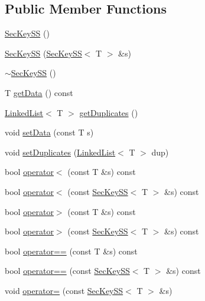 \subsection*{Public Member Functions}
\begin{DoxyCompactItemize}
\item 
\hyperlink{classSecKeySS_a9f905dffce0987d620cb2883b3f774cc}{Sec\+Key\+SS} ()
\item 
\hyperlink{classSecKeySS_ac9aecc7e01d33d17a98b732ac4f864c9}{Sec\+Key\+SS} (\hyperlink{classSecKeySS}{Sec\+Key\+SS}$<$ T $>$ \&s)
\item 
\hyperlink{classSecKeySS_ada9aac8a98536f84b46bc04b7acf9fec}{$\sim$\+Sec\+Key\+SS} ()
\item 
T \hyperlink{classSecKeySS_a9fdb8a771250b7aaab556f019b381eab}{get\+Data} () const
\item 
\hyperlink{classLinkedList}{Linked\+List}$<$ T $>$ \hyperlink{classSecKeySS_abef7c9c03e9bc6b818d599966428fdec}{get\+Duplicates} ()
\item 
void \hyperlink{classSecKeySS_ae893fbaf619bf61f73f1585ae5686609}{set\+Data} (const T s)
\item 
void \hyperlink{classSecKeySS_a95fdde8fc0b590359692784d15481dd4}{set\+Duplicates} (\hyperlink{classLinkedList}{Linked\+List}$<$ T $>$ dup)
\item 
bool \hyperlink{classSecKeySS_a4a77c5d5b609ef01c17f82001e9f1a7b}{operator$<$} (const T \&s) const
\item 
bool \hyperlink{classSecKeySS_ae39c46934a033ff213c1d1a7a32cd2bf}{operator$<$} (const \hyperlink{classSecKeySS}{Sec\+Key\+SS}$<$ T $>$ \&s) const
\item 
bool \hyperlink{classSecKeySS_a31bd2d2a2d8eeed14d478cbe88365843}{operator$>$} (const T \&s) const
\item 
bool \hyperlink{classSecKeySS_a5c5416d15e14212627b1076644abbb42}{operator$>$} (const \hyperlink{classSecKeySS}{Sec\+Key\+SS}$<$ T $>$ \&s) const
\item 
bool \hyperlink{classSecKeySS_ace15e2f5c729c58526f97919aff33036}{operator==} (const T \&s) const
\item 
bool \hyperlink{classSecKeySS_abf4a9212fdc1af29ddf44d5cbd6efca7}{operator==} (const \hyperlink{classSecKeySS}{Sec\+Key\+SS}$<$ T $>$ \&s) const
\item 
void \hyperlink{classSecKeySS_a2a04aabc21e56094354fd6c843d5a491}{operator=} (const \hyperlink{classSecKeySS}{Sec\+Key\+SS}$<$ T $>$ \&s)
\end{DoxyCompactItemize}



